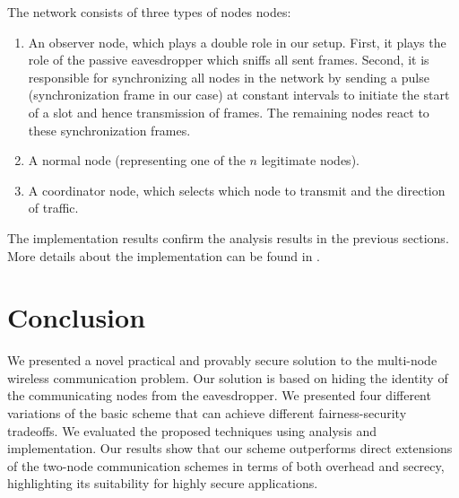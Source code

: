 \documentclass[10pt,letterpaper,conference]{IEEEtran}
\begin{document}
The network consists of three types of nodes nodes:

\begin{enumerate}
\item An observer node, which plays a double role in our setup. First, it
plays the role of the passive eavesdropper which sniffs all sent frames.
Second, it is responsible for synchronizing all nodes in the network by sending
a pulse (synchronization frame in our case) at constant intervals to initiate the
start of a slot and hence transmission of frames. The remaining nodes react to
 these synchronization frames.

\item A normal node (representing one of the $n$ legitimate nodes).

\item A coordinator node, which selects which node to transmit and the direction of traffic.
\end{enumerate}

The implementation results confirm the analysis results in the previous sections. More details about the implementation can be found in \cite{multinode_demo}.

\section{Conclusion}
\label{sec:conclude}
We presented a novel practical and provably secure solution to the multi-node wireless communication problem. Our solution is based on hiding the identity of the communicating nodes from the eavesdropper. We presented four different variations of the basic scheme that can achieve different fairness-security tradeoffs.
We evaluated the proposed techniques using analysis and implementation. Our results show that our scheme outperforms direct extensions of the two-node communication schemes in terms of both overhead and secrecy, highlighting its suitability for highly secure applications.
\end{document}
